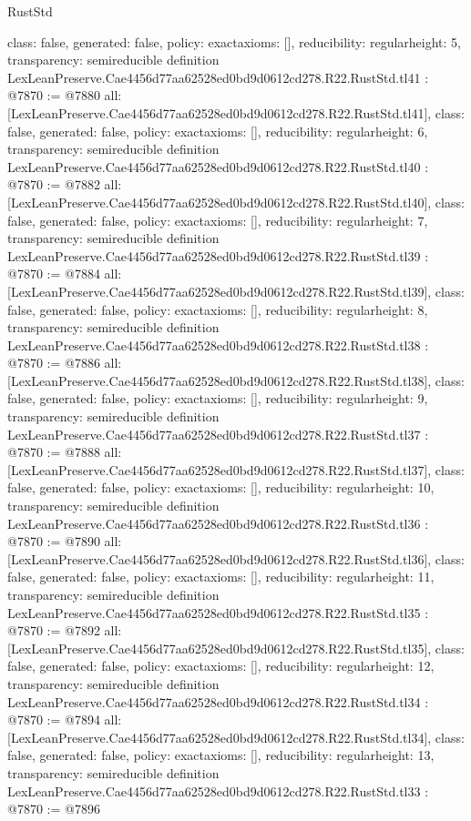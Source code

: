 \begin{lexlean}{RustStd}
\begin{coremodule}
{  class: false,
  generated: false,
  policy: exact{axioms: []},
  reducibility: regular{height: 5},
  transparency: semireducible
}
definition LexLeanPreserve.Cae4456d77aa62528ed0bd9d0612cd278.R22.RustStd.tl41 : @7870 := @7880 {
  all: [LexLeanPreserve.Cae4456d77aa62528ed0bd9d0612cd278.R22.RustStd.tl41],
  class: false,
  generated: false,
  policy: exact{axioms: []},
  reducibility: regular{height: 6},
  transparency: semireducible
}
definition LexLeanPreserve.Cae4456d77aa62528ed0bd9d0612cd278.R22.RustStd.tl40 : @7870 := @7882 {
  all: [LexLeanPreserve.Cae4456d77aa62528ed0bd9d0612cd278.R22.RustStd.tl40],
  class: false,
  generated: false,
  policy: exact{axioms: []},
  reducibility: regular{height: 7},
  transparency: semireducible
}
definition LexLeanPreserve.Cae4456d77aa62528ed0bd9d0612cd278.R22.RustStd.tl39 : @7870 := @7884 {
  all: [LexLeanPreserve.Cae4456d77aa62528ed0bd9d0612cd278.R22.RustStd.tl39],
  class: false,
  generated: false,
  policy: exact{axioms: []},
  reducibility: regular{height: 8},
  transparency: semireducible
}
definition LexLeanPreserve.Cae4456d77aa62528ed0bd9d0612cd278.R22.RustStd.tl38 : @7870 := @7886 {
  all: [LexLeanPreserve.Cae4456d77aa62528ed0bd9d0612cd278.R22.RustStd.tl38],
  class: false,
  generated: false,
  policy: exact{axioms: []},
  reducibility: regular{height: 9},
  transparency: semireducible
}
definition LexLeanPreserve.Cae4456d77aa62528ed0bd9d0612cd278.R22.RustStd.tl37 : @7870 := @7888 {
  all: [LexLeanPreserve.Cae4456d77aa62528ed0bd9d0612cd278.R22.RustStd.tl37],
  class: false,
  generated: false,
  policy: exact{axioms: []},
  reducibility: regular{height: 10},
  transparency: semireducible
}
definition LexLeanPreserve.Cae4456d77aa62528ed0bd9d0612cd278.R22.RustStd.tl36 : @7870 := @7890 {
  all: [LexLeanPreserve.Cae4456d77aa62528ed0bd9d0612cd278.R22.RustStd.tl36],
  class: false,
  generated: false,
  policy: exact{axioms: []},
  reducibility: regular{height: 11},
  transparency: semireducible
}
definition LexLeanPreserve.Cae4456d77aa62528ed0bd9d0612cd278.R22.RustStd.tl35 : @7870 := @7892 {
  all: [LexLeanPreserve.Cae4456d77aa62528ed0bd9d0612cd278.R22.RustStd.tl35],
  class: false,
  generated: false,
  policy: exact{axioms: []},
  reducibility: regular{height: 12},
  transparency: semireducible
}
definition LexLeanPreserve.Cae4456d77aa62528ed0bd9d0612cd278.R22.RustStd.tl34 : @7870 := @7894 {
  all: [LexLeanPreserve.Cae4456d77aa62528ed0bd9d0612cd278.R22.RustStd.tl34],
  class: false,
  generated: false,
  policy: exact{axioms: []},
  reducibility: regular{height: 13},
  transparency: semireducible
}
definition LexLeanPreserve.Cae4456d77aa62528ed0bd9d0612cd278.R22.RustStd.tl33 : @7870 := @7896 {
}
\end{coremodule}
\end{lexlean}
